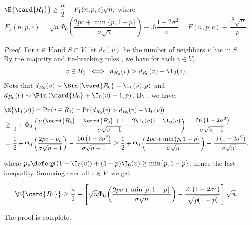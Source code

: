 \documentclass{toc}
\begin{document}
			
			
			\begin{claim} \label{claim:day-1-expection}
				$ \displaystyle
				\E{\card{R_1}} \ge \frac{n}{2} + F_1(n, p, c)\sqrt{n},
				$ where
				\[
				F_1(n, p, c) = \sqrt{n}\Phi_0\left(\frac{2pc  %
					+ \min\{p, 1 - p\}  %
				}{\sigma\sqrt{n}} \right) - .6\frac{1 - 2\sigma^2}{\sigma} = F(n, p, c) + \frac{.8\sqrt{n}}{p}.
				\]
				
			\end{claim}
			\begin{proof}
				For $v\in V$ and $S\subset V$, let $d_S(v)$ be the number of neighbors $v$ has in $S$.
				By the majority and tie-breaking rules  %
				, %
				we have for each $v\in V$,
				\begin{equation} \label{eq:a_1 meaning}
					v \in R_1 \ \iff \ d_{R_0}(v) > d_{B_0}(v) - \I_0(v).
				\end{equation}
				Note that $d_{R_0}(v) \sim \Bin\left(\card{R_0} - \I_0(v), p\right)$ and $d_{B_0}(v) \sim \Bin\left(\card{B_0} + \I_0(v) - 1, p\right)$.
				By , we have:
				\begin{linenomath}\begin{equation*} \label{eq:i1-v-bound}
						\begin{aligned}
							& \E{\I_1(v)} = \Pr\left(v\in R_1\right) = \Pr\left(d_{R_0}(v) > d_{B_0}(v) - \I_0(v) \right) \\
							& \ge \frac{1}{2} + \Phi_0\left(\frac{p\left(\card{R_0} - \card{B_0} + 1 - 2\I_0(v)\right) + \I_0(v)}{\sigma\sqrt{n - 1}}\right)
							- \frac{.56\left(1 - 2\sigma^2\right)}{\sigma\sqrt{n - 1}} \\
							& = \frac{1}{2} + \Phi_0\left(\frac{2pc + p_v}{\sigma\sqrt{n - 1}}\right)
							- \frac{.56\left(1 - 2\sigma^2\right)}{\sigma\sqrt{n - 1}}
							\ge \frac{1}{2} + \Phi_0\left(\frac{2pc + \min\{p, 1 - p\}}{\sigma\sqrt{n}}\right)
							- \frac{.6\left(1 - 2\sigma^2\right)}{\sigma\sqrt{n1}},  %
						\end{aligned}
				\end{equation*}\end{linenomath}
				where
				$ \displaystyle
				p_v \defeq p\left(1 - \I_0(v)\right) + (1 - p)\I_0(v) \ge %
				\min\{p, 1 - p\}  %
				$, hence the last inequality.
				Summing over all $v\in V$, we get
				\begin{linenomath}\begin{equation*}
						\begin{aligned}
							\E{\card{R_1}}
							\ge \frac{n}{2} + \left[\sqrt{n}\Phi_0\left(\frac{2pc  %
								+ \min\{p, 1 - p\}  %
							}{\sigma\sqrt{n}}\right)
							- \frac{.6\left(1 - 2\sigma^2\right)}{\sqrt{p(1 - p)}} \right] \sqrt{n}.
						\end{aligned}
				\end{equation*}\end{linenomath}
				The proof is complete.
			\end{proof}
			
\end{document}
